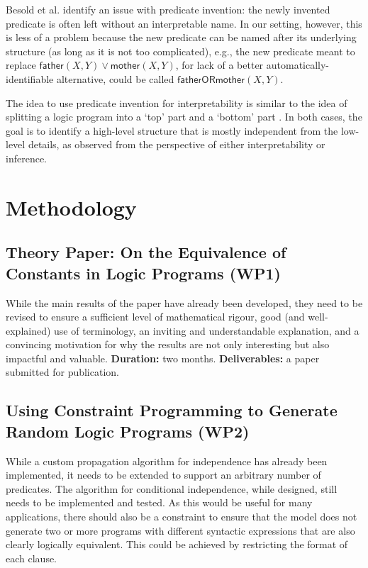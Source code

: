 \documentclass{article}
\begin{document}
Besold et al. \cite{DBLP:conf/ilp/SchmidZBTM16} identify an issue with predicate
invention: the newly invented predicate is often left without an interpretable
name. In our setting, however, this is less of a problem because the new
predicate can be named after its underlying structure (as long as it is not too
complicated), e.g., the new predicate meant to replace $\mathsf{father}(X, Y)
\lor \mathsf{mother}(X, Y)$, for lack of a better automatically-identifiable
alternative, could be called $\mathsf{fatherORmother}(X, Y)$.

The idea to use predicate invention for interpretability is similar to the idea
of splitting a logic program into a `top' part and a `bottom' part
\cite{DBLP:conf/iclp/LifschitzT94,DBLP:conf/aaai/JiWHY15}. In
both cases, the goal is to identify a high-level structure that is mostly
independent from the low-level details, as observed from the perspective of
either interpretability or inference.

\section{Methodology} \label{sec:methodology}

\subsection{Theory Paper: On the Equivalence of Constants in Logic Programs
  (WP1)}

While the main results of the paper have already been developed, they need to be
revised to ensure a sufficient level of mathematical rigour, good (and
well-explained) use of terminology, an inviting and understandable explanation,
and a convincing motivation for why the results are not only interesting but
also impactful and valuable. \textbf{Duration:} two months.
\textbf{Deliverables:} a paper submitted for publication.

\subsection{Using Constraint Programming to Generate Random Logic Programs
  (WP2)}

While a custom propagation algorithm for independence has already been
implemented, it needs to be extended to support an arbitrary number of
predicates. The algorithm for conditional independence, while designed, still
needs to be implemented and tested. As this would be useful for many
applications, there should also be a constraint to ensure that the model does
not generate two or more programs with different syntactic expressions that are
also clearly logically equivalent. This could be achieved by restricting the
format of each clause.
\end{document}
